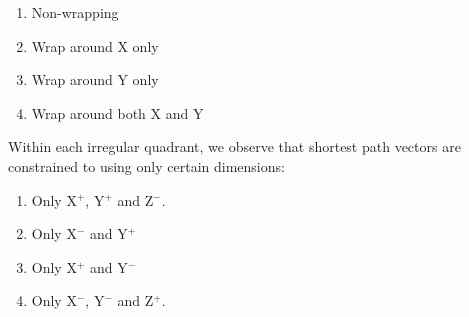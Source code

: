 			\begin{enumerate}
				\item Non-wrapping
				\item Wrap around X only
				\item Wrap around Y only
				\item Wrap around both X and Y
			\end{enumerate}
			
			Within each irregular quadrant, we observe that shortest path vectors are
			constrained to using only certain dimensions:
			
			\begin{enumerate}
				\item Only X$^+$, Y$^+$ and Z$^-$.
				\item Only X$^-$ and Y$^+$
				\item Only X$^+$ and Y$^-$
				\item Only X$^-$, Y$^-$ and Z$^+$.
			\end{enumerate}
			
